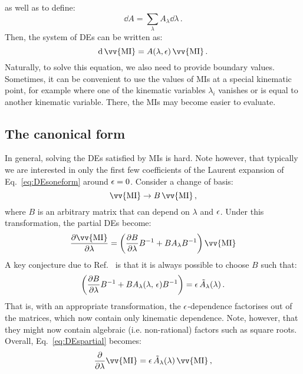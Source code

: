 \documentclass[main.tex]{subfiles}
\begin{document}
as well as to define:
\begin{equation}
    \dd A = \sum_\lambda A_\lambda \dd\lambda\,.
\end{equation}
Then, the system of DEs can be written as:
\begin{equation} \label{eq:DEsoneform}
    \dd \,\vv{\text{MI}} = A(\lambda, \eps) \,\vv{\text{MI}}\,.
\end{equation}
Naturally, to solve this equation, we also need to provide boundary values. Sometimes, it can be convenient to use the values of MIs at a special kinematic point, for example where one of the kinematic variables $\lambda_i$ vanishes or is equal to another kinematic variable. There, the MIs may become easier to evaluate. 
\subsection{The canonical form} \label{sec:canonicalform}
In general, solving the DEs satisfied by MIs is hard. Note however, that typically we are interested in only the first few coefficients of the Laurent expansion of Eq.~\ref{eq:DEsoneform} around $\epsilon=0$. Consider a change of basis:
\begin{equation} \label{eq:basistransformation}
    \vv{\text{MI}} \rightarrow B\,\vv{\text{MI}}\,,
\end{equation}
where $B$ is an arbitrary matrix that can depend on $\lambda$ and $\epsilon$. Under this transformation, the partial DEs become:
\begin{equation}
    \frac{\partial \vv{\text{MI}}}{\partial \lambda} = \left( \frac{\partial B}{\partial \lambda}B^{-1} + B A_{\lambda} B^{-1} \right) \vv{\text{MI}}
\end{equation}
A key conjecture due to Ref.~\cite{Henn:2013pwa} is that it is always possible to choose $B$ such that:
\begin{equation}
    \left( \frac{\partial B}{\partial \lambda}B^{-1} + B A_{\lambda}(\lambda, \, \epsilon) B^{-1} \right) = \epsilon \, \tilde{A}_{\lambda}(\lambda)\,.
\end{equation}
That is, with an appropriate transformation, the $\epsilon$-dependence factorises out of the matrices, which now contain only kinematic dependence. Note, however, that they might now contain algebraic (i.e. non-rational) factors such as square roots. Overall, Eq.~\ref{eq:DEspartial} becomes:
\begin{equation} \label{eq:canonicalDEspartial}
    \frac{\partial}{\partial \lambda} \vv{\text{MI}} = \eps \, \tilde{A}_{\lambda}(\lambda) \, \vv{\text{MI}}\,, 
\end{equation}
\end{document}
